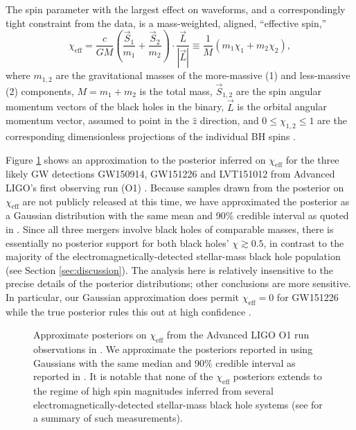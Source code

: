 \documentclass[modern,linenumbers]{aastex61}
\newcommand{\chieff}{\chi_\mathrm{eff}}
\begin{document}
The spin parameter with the largest effect on waveforms, and a
correspondingly tight constraint from the data, is a mass-weighted,
aligned, ``effective spin,''
\begin{equation}
  \chieff = \frac{c}{GM} \left( \frac{\vec{S}_1}{m_1} + \frac{\vec{S}_2}{m_2}
  \right) \cdot \frac{\vec{L}}{\left| \vec{L} \right|} \equiv \frac{1}{M} \left( m_1 \chi_1 + m_2 \chi_2 \right),
\end{equation}
where $m_{1,2}$ are the gravitational masses of the more-massive (1)
and less-massive (2) components, $M = m_1 + m_2$ is the total mass,
$\vec{S}_{1,2}$ are the spin angular momentum vectors of the black
holes in the binary, $\vec{L}$ is the orbital angular momentum vector,
assumed to point in the $\hat{z}$ direction, and
$0 \leq \chi_{1,2} \leq 1$ are the corresponding dimensionless
projections of the individual \ac{BH} spins
\citep{2016PhRvL.116x1102A}.

Figure \ref{fig:O1-posteriors} shows an approximation to the posterior
inferred on $\chieff$ for the three likely \ac{GW} detections
GW150914, GW151226 and LVT151012 from Advanced LIGO's first observing
run (O1) \citep{O1-BBH}.  Because samples drawn from the posterior on
$\chieff$ are not publicly released at this time, we have approximated
the posterior as a Gaussian distribution with the same mean and 90\%
credible interval as quoted in \citet{O1-BBH}.  Since all three
mergers involve black holes of comparable masses, there is essentially
no posterior support for both black holes' $\chi \gtrsim 0.5$, in
contrast to the majority of the electromagnetically-detected
stellar-mass black hole population (see Section \ref{sec:discussion}).
The analysis here is relatively insensitive to the precise details of
the posterior distributions; other conclusions are more sensitive.  In
particular, our Gaussian approximation does permit $\chieff = 0$ for
GW151226 while the true posterior rules this out at high confidence
\citep{2016PhRvL.116x1103A,O1-BBH}.

\begin{figure}
  \caption{\label{fig:O1-posteriors} Approximate posteriors on
    $\chieff$ from the Advanced LIGO O1 run observations in
    \citet{O1-BBH}.  We approximate the posteriors reported in
    \citet{O1-BBH} using Gaussians with the same median and 90\%
    credible interval as reported in \citet{O1-BBH}.  It is notable
    that none of the $\chieff$ posteriors extends to the regime of
    high spin magnitudes inferred from several
    electromagnetically-detected stellar-mass black hole systems (see
    \citet{2015PhR...548....1M} for a summary of such measurements).}
\end{figure}
\end{document}
